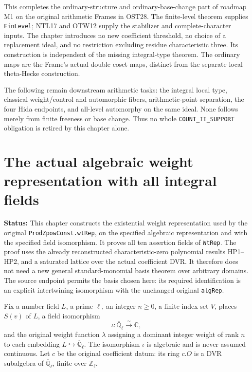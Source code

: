 \documentclass[11pt,a4paper]{article}
\numberwithin{equation}{section}
\theoremstyle{remark}\newtheorem{remark}[theorem]{Remark}
\newcommand{\status}[1]{\textbf{Status:} #1}
\begin{document}
This completes the ordinary-structure and ordinary-base-change
part of roadmap M1 on the original arithmetic Frames in OST28.
The finite-level theorem supplies \texttt{Fin\allowbreak Level}; NTL17
and OTW12 supply the stabilizer and complete-character inputs.
The chapter introduces no new coefficient threshold, no choice
of a replacement ideal, and no restriction excluding residue
characteristic three.  Its construction is independent of the
missing integral-type theorem.  The ordinary maps are the
Frame's actual double-coset maps, distinct from the separate
local theta-Hecke construction.

The following remain downstream arithmetic tasks: the
integral local type, classical weight/control and automorphic
fibers, arithmetic-point separation, the four Hida endpoints,
and all-level automorphy on the same ideal.  None follows merely
from finite freeness or base change.  Thus no whole
\texttt{COUNT\_\allowbreak II\_\allowbreak SUPPORT} obligation is retired by this
chapter alone.


\section{The actual algebraic weight representation with all integral fields}
\label{sec:weight-representation-v42}

\status{This chapter constructs the existential weight representation
used by the original \texttt{Prod\allowbreak Zpow\allowbreak Const.\allowbreak wt\allowbreak Rep}, on the specified
algebraic representation and with the specified field isomorphism.
It proves all ten assertion fields of \texttt{Wt\allowbreak Rep}.  The proof uses
the already reconstructed characteristic-zero polynomial results
HP1--HP2, and a saturated lattice over the actual coefficient DVR.
It therefore does not need a new general standard-monomial basis
theorem over arbitrary domains.  The source endpoint permits the
basis chosen here: its required identification is an explicit
intertwining isomorphism with the unchanged original
\texttt{alg\allowbreak Rep}.}

Fix a number field $L$, a prime $\ell$, an integer $n\geq0$, a
finite index set $V$, places $S(v)$ of $L$, a field isomorphism
\[
             \iota:\overline{\mathbb Q}_\ell\xrightarrow{\sim}
                                                              \mathbb C,
\]
and the original weight function $\lambda$ assigning a dominant
integer weight of rank $n$ to each embedding
$L\hookrightarrow\overline{\mathbb Q}_\ell$.  The isomorphism
$\iota$ is algebraic and is never assumed continuous.  Let $c$
be the original coefficient datum: its ring $c.O$ is a DVR
subalgebra of $\overline{\mathbb Q}_\ell$, finite over
$\mathbb Z_\ell$.
\end{document}
